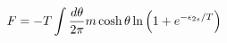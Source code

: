 \begin{equation}
    F=-T\int {d\theta\over 2\pi} m\cosh\theta\ln\left(1+e^{-\epsilon_{2s}/T}\right)
    \end{equation}

